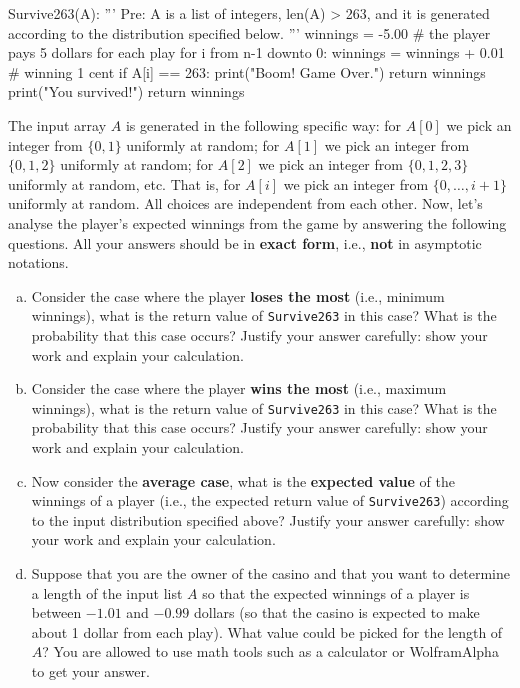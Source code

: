 \documentclass{assignment-263}
\begin{document}
\begin{enumerate}
\begin{python}
   Survive263(A):
      '''
      Pre: A is a list of integers, len(A) > 263, and it is generated 
           according to the distribution specified below.
      '''
      winnings = -5.00   # the player pays 5 dollars for each play
      for i from n-1 downto 0:
         winnings = winnings + 0.01  # winning 1 cent
         if A[i] == 263:
            print("Boom! Game Over.")
            return winnings
      print("You survived!")
      return winnings
\end{python}

		The input array $A$ is generated in the following specific way: for
		$A[0]$ we pick an integer from $\{0, 1\}$ uniformly at random; for
		$A[1]$ we pick an integer from $\{0, 1, 2\}$ uniformly at random;
		for $A[2]$ we pick an integer from $\{0, 1, 2, 3\}$ uniformly at
		random, etc. That is, for $A[i]$ we pick  an integer from
		$\{0,\ldots, i+1\}$ uniformly at random. All choices are independent
		from each other. Now, let's analyse the player's expected winnings
		from the game by answering the following questions. 
		All your answers
		should be in \textbf{exact form}, i.e., \textbf{not} in asymptotic
		notations.

		\begin{enumerate}[(a)]

			\item Consider the case where the player \textbf{loses the most}
				(i.e., minimum winnings), what is the return value of
				\texttt{Survive263} in this case? What is the probability that this case
				occurs? Justify your answer carefully: show your work and
				explain your calculation.

			\item Consider the case where the player \textbf{wins the most}
				(i.e., maximum winnings), what is the return value of
				\texttt{Survive263} in this case? What is the probability that this case
				occurs? Justify your answer carefully: show your work and
				explain your calculation.

			\item Now consider the \textbf{average case}, what is the
				\textbf{expected value} of the winnings of a player (i.e.,
				the expected return value of \texttt{Survive263}) according to
				the input distribution specified above? Justify your answer
				carefully: show your work and explain your calculation.

			\item Suppose that you are the owner of the casino and that you want to
				determine a length of the input list $A$ so that the
				expected winnings of a player is between $-1.01$ and $-0.99$
				dollars (so that the casino is expected to make about 1
				dollar from each play). What value could be picked for the
				length of $A$? You are allowed to use math tools such as a
				calculator or WolframAlpha to get your answer.
		\end{enumerate}

	\end{enumerate}
\end{document}
